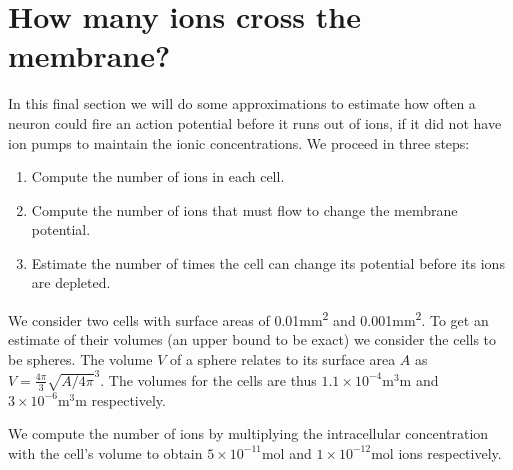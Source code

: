 \section{How many ions cross the membrane?}

In this final section we will do some approximations to estimate how often a neuron could fire an action potential before it runs out of ions, if it did not have ion pumps to maintain the ionic concentrations. We proceed in three steps:
\begin{enumerate}
\item Compute the number of ions in each cell.
\item Compute the number of ions that must flow to change the membrane potential.
\item Estimate the number of times the cell can change its potential before its ions are depleted.
\end{enumerate}
We consider two cells with surface areas of 0.01\si{\square\milli\meter} and 0.001\si{\square\milli\meter}. To get an estimate of their volumes (an upper bound to be exact) we consider the cells to be spheres. The volume $V$ of a sphere relates to its surface area $A$ as $V=\frac{4\pi}{3}\sqrt{A/4\pi}^3$. The volumes for the cells are thus $1.1 \times 10^{-4}\si{\cubic\milli\meter}$ and $3 \times 10^{-6}\si{\cubic\milli\meter}$ respectively.

We compute the number of  ions by multiplying the intracellular concentration with the cell's volume to obtain $5 \times 10^{-11}\si{\mole}$ and $1 \times 10^{-12}\si{\mole}$  ions respectively.

